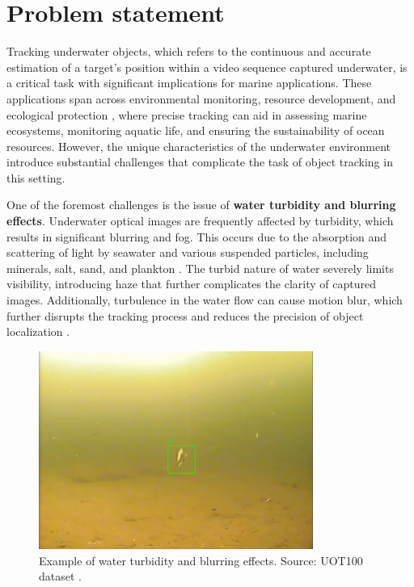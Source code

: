 \chapter{Problem statement}
\label{ch:chap1}

Tracking underwater objects, which refers to the continuous and accurate estimation of a target's position within a video sequence captured underwater, is a critical task with significant implications for marine applications. These applications span across environmental monitoring, resource development, and ecological protection \cite{qiu2024boundary}, where precise tracking can aid in assessing marine ecosystems, monitoring aquatic life, and ensuring the sustainability of ocean resources. However, the unique characteristics of the underwater environment introduce substantial challenges that complicate the task of object tracking in this setting.

One of the foremost challenges is the issue of \textbf{water turbidity and blurring effects}. Underwater optical images are frequently affected by turbidity, which results in significant blurring and fog. This occurs due to the absorption and scattering of light by seawater and various suspended particles, including minerals, salt, sand, and plankton \cite{zhou2024real, elmezain2025advancing, bhadouriaunderwater}. The turbid nature of water severely limits visibility, introducing haze that further complicates the clarity of captured images. Additionally, turbulence in the water flow can cause motion blur, which further disrupts the tracking process and reduces the precision of object localization \cite{bhadouriaunderwater}.

\begin{figure}[ht]
    \centering
    \includegraphics[width=0.8\textwidth]{images/water turbidity and blurring effects.png}
    \caption{Example of water turbidity and blurring effects. Source: UOT100 dataset \cite{kezebou2019underwater}.}
    \label{fig:turbidity}
\end{figure}


